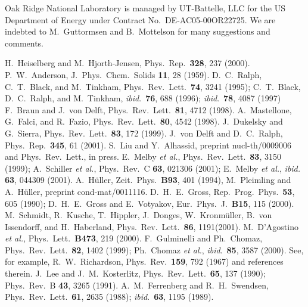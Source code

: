 \begin{multicols}{2}
Oak Ridge National Laboratory is
managed by UT-Battelle, LLC for the US Department of Energy 
under Contract No.~DE-AC05-00OR22725. We are indebted to M.~Guttormsen 
and B.~Mottelson for many suggestions and comments.

\begin{references}
 H.~Heiselberg and M.~Hjorth-Jensen, Phys.~Rep.~{\bf 328},
237 (2000).
 P.~W.~Anderson, J.~Phys.~Chem.~Solids {\bf 11}, 28 (1959).
 D.~C.~Ralph, C.~T.~Black, and M.~Tinkham, 
                      Phys.~Rev.~Lett.~{\bf 74}, 3241 (1995); C.~T.~Black, D.~C.~Ralph, 
                      and M.~Tinkham, {\em ibid}.~{\bf 76}, 688 (1996); 
                      {\em ibid}.~{\bf 78}, 4087 (1997) 
 F.~Braun and J.~von Delft, Phys.~Rev.~Lett.~{\bf 81}, 4712 (1998).
 A.~Mastellone, G.~Falci, and R.~Fazio, 
                       Phys.~Rev.~Lett.~{\bf 80}, 4542 (1998).
 J.~Dukelsky and G.~Sierra, Phys.~Rev.~Lett.~{\bf 83}, 172 (1999).
 J.~von Delft and D.~C.~Ralph, Phys.~Rep.~{\bf 345}, 61 (2001).
 S.~Liu and Y.~Alhassid, preprint nucl-th/0009006 and Phys.~Rev.~Lett., in press. 
E.~Melby {\em et al.},
                     Phys.~Rev.~Lett.~{\bf 83}, 3150 (1999); A.~Schiller {\em et al.}, 
                     Phys.\ Rev.~C {\bf 63}, 021306 (2001); 
                     E.~Melby {\em et al.}, {\em ibid.} {\bf 63}, 
                     044309 (2001).
 A.~H\"{u}ller, Zeit.~Phys.~{\bf B93}, 401 (1994), M.~Pleimling and
A.~H\"uller, preprint cond-mat/0011116.
 D.~H.~E.~Gross, Rep.~Prog.~Phys.~{\bf 53}, 605
    (1990);   D.~H.~E.~Gross and E.~Votyakov, Eur.~Phys.~J.~{\bf B15}, 115 (2000).
 M.~Schmidt, R.~Kusche, T.~Hippler, J.~Donges, W.~Kronm\"uller, 
                    B.~von Issendorff, and H.~Haberland,   
                    Phys.~Rev.~Lett.~{\bf 86}, 1191(2001).
M.~D'Agostino {\em et al.}, Phys.~Lett.~{\bf B473}, 219 (2000).
 F.~Gulminelli and Ph.~Chomaz, Phys.~Rev.~Lett.~{\bf 82}, 1402 (1999); 
               Ph.~Chomaz {\em et al.}, {\em ibid}.~{\bf 85}, 3587 (2000). 
 See, for example, R.~W.~Richardson, Phys.~Rev.~{\bf 159},
                     792 (1967) and references therein.
 J.~Lee and J.~M.~Kosterlitz, Phys.~Rev.~Lett.~{\bf 65}, 137 (1990);
                Phys.~Rev.~B {\bf 43}, 3265 (1991).
 A.~M.~Ferrenberg and R.~H.~Swendsen, Phys.~Rev.~Lett.~{\bf 61}, 2635 (1988); {\em ibid}.~{\bf 63}, 1195 (1989).


\end{references}
\end{multicols}

